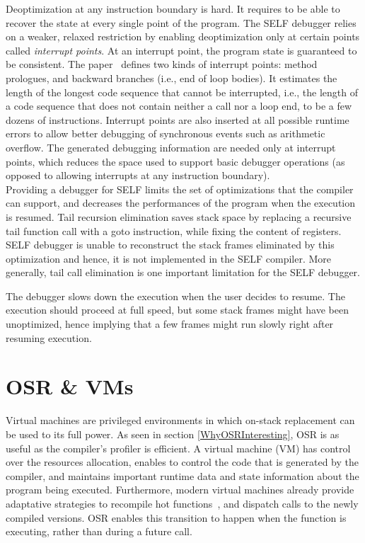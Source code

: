 Deoptimization at any instruction boundary is hard. 
It requires to be able to recover the state at every single point of the program.
The SELF debugger relies on a weaker, relaxed restriction by enabling deoptimization only at certain points called \textit{interrupt points}. 
At an interrupt point, the program state is guaranteed to be consistent. 
The paper~\cite{holzle1992debugging} defines two kinds of interrupt points: method prologues, and backward branches (i.e., end of loop bodies).
It estimates the length of the longest code sequence that cannot be interrupted, i.e., the  length of a code sequence that does not contain neither a call nor a loop end, to be a few dozens of instructions.
Interrupt points are also inserted at all possible runtime errors to allow better debugging of synchronous events such as arithmetic overflow. 
The generated debugging information are needed only at interrupt points, which reduces the space used to support basic debugger operations (as opposed to allowing interrupts at any instruction boundary).\\

Providing a debugger for SELF limits the set of optimizations that the compiler can support, and decreases the performances of the program when the execution is resumed. 
Tail recursion elimination saves stack space by replacing a recursive tail function call with a goto instruction, while fixing the content of registers.
SELF debugger is unable to reconstruct the stack frames eliminated by this optimization and hence, it is not implemented in the SELF compiler.
More generally, tail call elimination is one important limitation for the SELF debugger.

The debugger slows down the execution when the user decides to resume. 
The execution should proceed at full speed, but some stack frames might have been unoptimized, hence implying that a few frames might run slowly right after resuming execution.\\

\section{OSR \& VMs}
Virtual machines are privileged environments in which on-stack replacement can be used to its full power.
As seen in section \ref{WhyOSRInteresting}, OSR is as useful as the compiler's profiler is efficient.
A virtual machine (VM) has control over the resources allocation, enables to control the code that is generated by the compiler, and maintains important runtime data and state information about the program being executed.
Furthermore, modern virtual machines already provide adaptative strategies to recompile hot functions~\cite{arnold2000adaptive, paleczny2001java, holzle1994third, suganuma2001dynamic}, and dispatch calls to the newly compiled versions.
OSR enables this transition to happen when the function is executing, rather than during a future call.\\

